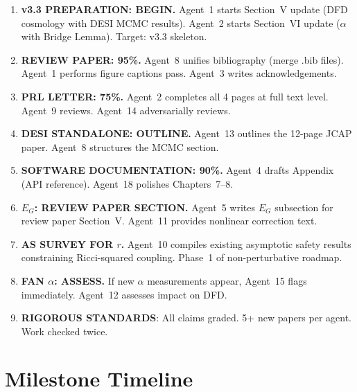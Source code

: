 \documentclass[11pt,a4paper]{article}
\begin{document}
\begin{enumerate}
\item \textbf{v3.3 PREPARATION: BEGIN.} Agent~1 starts Section~V update (DFD cosmology with DESI MCMC results). Agent~2 starts Section~VI update ($\alpha$ with Bridge Lemma). Target: v3.3 skeleton.

\item \textbf{REVIEW PAPER: 95\%.} Agent~8 unifies bibliography (merge .bib files). Agent~1 performs figure captions pass. Agent~3 writes acknowledgements.

\item \textbf{PRL LETTER: 75\%.} Agent~2 completes all 4 pages at full text level. Agent~9 reviews. Agent~14 adversarially reviews.

\item \textbf{DESI STANDALONE: OUTLINE.} Agent~13 outlines the 12-page JCAP paper. Agent~8 structures the MCMC section.

\item \textbf{SOFTWARE DOCUMENTATION: 90\%.} Agent~4 drafts Appendix (API reference). Agent~18 polishes Chapters~7--8.

\item \textbf{$E_G$: REVIEW PAPER SECTION.} Agent~5 writes $E_G$ subsection for review paper Section~V. Agent~11 provides nonlinear correction text.

\item \textbf{AS SURVEY FOR $r$.} Agent~10 compiles existing asymptotic safety results constraining Ricci-squared coupling. Phase~1 of non-perturbative roadmap.

\item \textbf{FAN $\alpha$: ASSESS.} If new $\alpha$ measurements appear, Agent~15 flags immediately. Agent~12 assesses impact on DFD.

\item \textbf{RIGOROUS STANDARDS}: All claims graded. 5+ new papers per agent. Work checked twice.
\end{enumerate}


\section{Milestone Timeline}
\label{sec:timeline}
\end{document}
